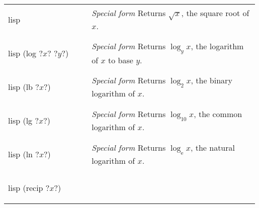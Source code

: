 \documentclass[a4paper, 12pt]{article}
\makeatletter
\newenvironment{funcdefs}
    {\begin{longtable}{@{} x{0.33\linewidth} @{} >{\raggedright\arraybackslash}p{0.66\linewidth} @{}}}
    {\end{longtable}}
\def\specialf/{\textit{Special form}\hspace{0.5em}}
\makeatother
\begin{document}
\begin{funcdefs}
\begin{minipage}[t]{\linewidth}
\begin{cminted}[autogobble=true, escapeinside=??]{lisp}
        \end{cminted}
    \end{minipage}
    & \specialf/ Returns $\sqrt{x}$, the square root of $x$.
    \\ \\
    \begin{minipage}[t]{\linewidth}
        \centering
        \begin{cminted}[autogobble=true, escapeinside=??]{lisp}
            (log ?$x$? ?$y$?)
        \end{cminted}
    \end{minipage}
    & \specialf/ Returns $\log_{y}{x}$, the logarithm of $x$ to base $y$.
    \\ \\
    \begin{minipage}[t]{\linewidth}
        \centering
        \begin{cminted}[autogobble=true, escapeinside=??]{lisp}
            (lb ?$x$?)
        \end{cminted}
    \end{minipage}
    & \specialf/ Returns $\log_{2}{x}$, the binary logarithm of $x$.
    \\ \\
    \begin{minipage}[t]{\linewidth}
        \centering
        \begin{cminted}[autogobble=true, escapeinside=??]{lisp}
            (lg ?$x$?)
        \end{cminted}
    \end{minipage}
    & \specialf/ Returns $\log_{10}{x}$, the common logarithm of $x$.
    \\ \\
    \begin{minipage}[t]{\linewidth}
        \centering
        \begin{cminted}[autogobble=true, escapeinside=??]{lisp}
            (ln ?$x$?)
        \end{cminted}
    \end{minipage}
    & \specialf/ Returns $\log_{\mathrm{e}}{x}$, the natural logarithm of $x$.
    \\ \\
    \begin{minipage}[t]{\linewidth}
        \centering
        \begin{cminted}[autogobble=true, escapeinside=??]{lisp}
            (recip ?$x$?)
        \end{cminted}
    \end{minipage}

\end{funcdefs}
\end{document}
